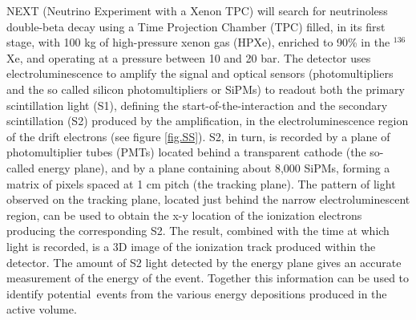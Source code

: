 \documentclass[a4paper,11pt]{article}
\begin{document}
NEXT (Neutrino Experiment with a Xenon TPC) \cite{Gomez-Cadenas:2014dxa} will search for neutrinoless double-beta decay using a Time Projection Chamber (TPC) filled, in its first stage, with 100 kg of 
high-pressure xenon gas (HPXe), enriched to 90\% in the $^{136}$Xe, and operating at a pressure between 10 and 20 bar.  The detector uses electroluminescence to amplify the signal and optical sensors (photomultipliers and the so called silicon photomultipliers or SiPMs) to readout both the primary scintillation light (S1), defining the start-of-the-interaction and the secondary scintillation (S2) produced by the amplification, in the electroluminescence region of the drift electrons (see figure \ref{fig.SS}). S2, in turn, is recorded by a plane of photomultiplier tubes (PMTs) located behind a transparent cathode (the so-called energy plane), and by a plane containing about 8,000 SiPMs, forming a matrix of pixels spaced at 1 cm pitch (the tracking plane). 
The pattern of light observed on the tracking plane, located just behind the narrow 
electroluminescent region, can be used to obtain the x-y location of the ionization electrons producing the corresponding S2.  The result, combined with the time at which light is recorded, is a 3D image of the ionization track produced within the 
detector.  The amount of S2 light detected by the energy plane gives an accurate measurement of the energy of the event.  Together this information can be used to identify potential 
\bbonu\,events from the various energy depositions produced in the active volume.
\end{document}
